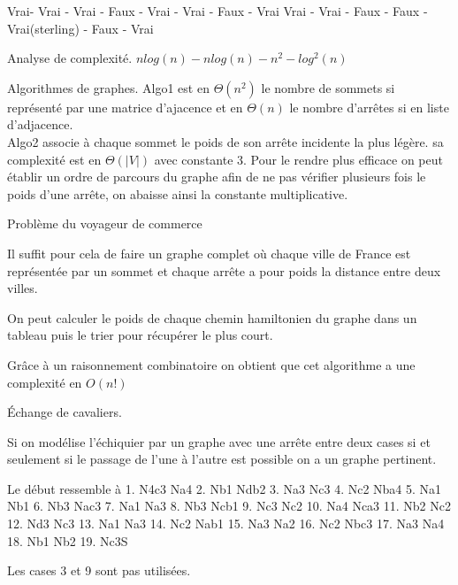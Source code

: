 \documentclass{report}
\begin{document}
\begin{exo}
    Vrai- Vrai - Vrai - Faux - Vrai - Vrai - Faux - Vrai
    Vrai - Vrai - Faux - Faux - Vrai(sterling) - Faux - Vrai
\end{exo}

\begin{exo}
    Analyse de complexité.
    \(nlog(n) - nlog(n) - n^2 - log^2(n)\)
\end{exo}

\begin{exo}
    Algorithmes de graphes.
    Algo1 est en \(\Theta(n^2)\) le nombre de sommets si représenté par une matrice
    d'ajacence et en \(\Theta(n)\) le nombre d'arrêtes si en liste d'adjacence. \\
    Algo2 associe à chaque sommet le poids de son arrête incidente la plus légère.
    sa complexité est en \(\Theta(|V|)\) avec constante 3. Pour le rendre plus
    efficace on peut établir un ordre de parcours du graphe afin de ne pas vérifier
    plusieurs fois le poids d'une arrête, on abaisse ainsi la constante
    multiplicative.
\end{exo}

\begin{exo}
    Problème du voyageur de commerce
    \begin{q}{1}
        Il suffit pour cela de faire un graphe complet où chaque ville de France
        est représentée par un sommet et chaque arrête a pour poids la distance entre deux villes.
    \end{q}
    \begin{q}{2}
        On peut calculer le poids de chaque chemin hamiltonien du graphe dans un tableau
        puis le trier pour récupérer le plus court.
    \end{q}
    \begin{q}{3}
        Grâce à un raisonnement combinatoire on obtient que cet algorithme
        a une complexité en \(O(n!)\)
    \end{q}
\end{exo}

\begin{exo}
    Échange de cavaliers.
    \begin{q}{1}
        Si on modélise l'échiquier par un graphe avec une arrête entre deux cases
        si et seulement si le passage de l'une à l'autre est possible on a un graphe pertinent.
    \end{q}
    \begin{q}{2}
        Le début ressemble à 1. N4c3 Na4 2. Nb1 Ndb2 3. Na3 Nc3 4. Nc2 Nba4 5. Na1 Nb1 6. Nb3 Nac3 7. Na1 Na3
        8. Nb3 Ncb1 9. Nc3 Nc2 10. Na4 Nca3 11. Nb2 Nc2 12. Nd3 Nc3 13. Na1 Na3 14. Nc2
        Nab1 15. Na3 Na2 16. Nc2 Nbc3 17. Na3 Na4 18. Nb1 Nb2 19. Nc3S
    \end{q}
    \begin{q}{3}
        Les cases 3 et 9 sont pas utilisées.
    \end{q}
\end{exo}
\end{document}
